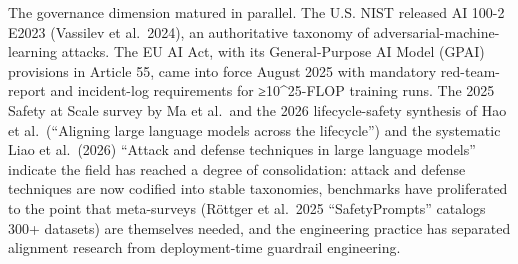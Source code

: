 The governance dimension matured in parallel. The U.S. NIST released AI 100-2 E2023 (Vassilev et al.~2024), an authoritative taxonomy of adversarial-machine-learning attacks. The EU AI Act, with its General-Purpose AI Model (GPAI) provisions in Article 55, came into force August 2025 with mandatory red-team-report and incident-log requirements for ≥10\^{}25-FLOP training runs. The 2025 Safety at Scale survey by Ma et al.~and the 2026 lifecycle-safety synthesis of Hao et al.~(``Aligning large language models across the lifecycle'') and the systematic Liao et al.~(2026) ``Attack and defense techniques in large language models'' indicate the field has reached a degree of consolidation: attack and defense techniques are now codified into stable taxonomies, benchmarks have proliferated to the point that meta-surveys (Röttger et al.~2025 ``SafetyPrompts'' catalogs 300+ datasets) are themselves needed, and the engineering practice has separated alignment research from deployment-time guardrail engineering.

